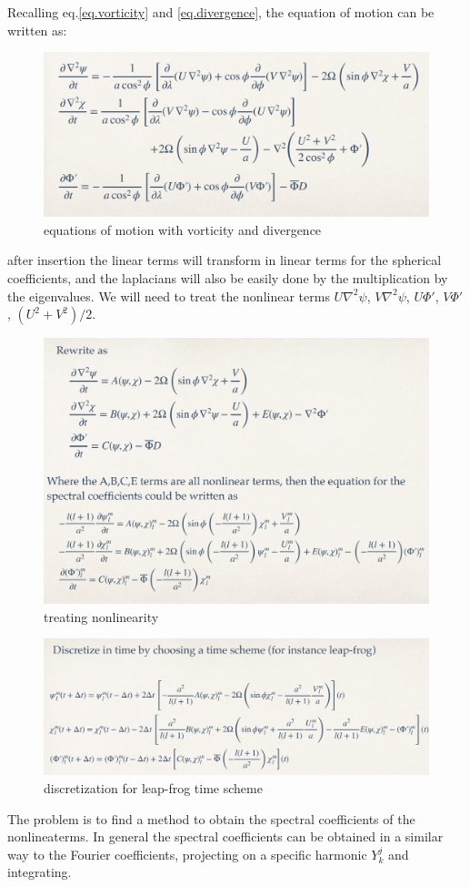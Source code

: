 Recalling eq.\ref{eq.vorticity} and \ref{eq.divergence}, the equation of motion can be written as:
\begin{figure}[h]
    \centering
    \includegraphics[width=0.5\linewidth]{uploads/Screenshot 2024-11-18 094959.png}
    \caption{equations of motion with vorticity and divergence}
    \label{fig.eqmotion}
\end{figure}
after insertion the linear terms will transform in linear terms for the spherical coefficients, and the laplacians will also be easily done by the multiplication by the eigenvalues. We will need to treat the nonlinear terms $U\nabla^2\psi$, $V\nabla^2\psi$, $U\Phi'$, $V\Phi'$, $(U^2+V^2)/2$.  
\begin{figure}[h]
    \centering
    \includegraphics[width=0.5\linewidth]{uploads/Screenshot 2024-11-18 095232.png}
    \caption{treating nonlinearity}
    \label{fig:trating nonlinearity}
\end{figure}
\begin{figure}[h]
    \centering
    \includegraphics[width=0.5\linewidth]{uploads/Screenshot 2024-11-18 095428.png}
    \caption{discretization for leap-frog time scheme}
    \label{fig:discretization for leap-frog time scheme}
\end{figure}
The problem is to find a method to obtain the spectral coefficients of the nonlineaterms. In general the spectral coefficients can be obtained in a similar way to the
Fourier coefficients, projecting on a specific harmonic $Y_k^j$ and integrating.
